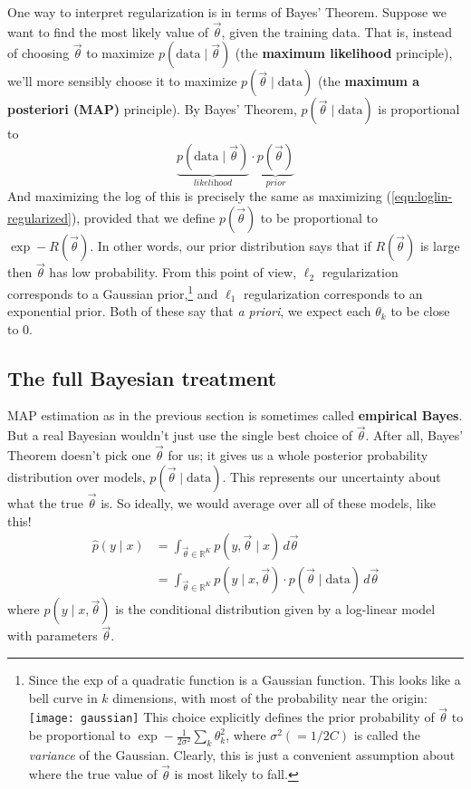 \documentclass[11pt]{article}
\newcommand{\vtheta}{\vec{\theta}}
\newcommand{\ph}{\hat{p}}
\newcommand{\Real}{{\mathbb R}}
\begin{document}
One way to interpret regularization is in terms of Bayes'
Theorem.  Suppose we want to find the most likely value of $\vtheta$,
given the training data.  That is, instead of choosing $\vtheta$ to
maximize $p(\textrm{data} \mid \vtheta)$ (the {\bf maximum likelihood}
principle), we'll more sensibly choose it to maximize $p(\vtheta \mid
\textrm{data})$ (the {\bf maximum a posteriori (MAP)} principle).  By
Bayes' Theorem, $p(\vtheta \mid \textrm{data})$ is proportional to
\begin{equation}
\underbrace{p(\textrm{data} \mid \vtheta)}_{\textit{likelihood}} \cdot \underbrace{p(\vtheta)}_{\textit{prior}}
\end{equation}
And maximizing the log of this is precisely the same as maximizing
(\ref{eqn:loglin-regularized}), provided that we define $p(\vtheta)$
to be proportional to $\exp -R(\vtheta)$.  In other words, our prior
distribution says that if $R(\vtheta)$ is large then $\vtheta$ has low
probability.  From this point of view, $\ell_2$ regularization
corresponds to a Gaussian prior,\footnote{Since the exp of a quadratic
  function is a Gaussian function.  This looks like a bell curve in
  $k$ dimensions, with most of the probability near the
  origin: \texttt{[image: gaussian]} This choice explicitly defines the prior
  probability of $\vtheta$ to be proportional to $\exp -\frac{1}{2\sigma^2} \sum_k
  \theta_k^2$, where $\sigma^2 (= 1/2C)$ is called the {\em variance} of the
  Gaussian.  Clearly, this is just a convenient assumption about
  where the true value of $\vtheta$ is most likely to fall.%
}  and $\ell_1$
regularization corresponds to an exponential prior.  Both of these say
that {\em a priori}, we expect each $\theta_k$ to be close to 0.

\subsection{The full Bayesian treatment}

MAP estimation as in the previous section is sometimes called {\bf empirical Bayes}.  But a real Bayesian wouldn't just use the single best choice of $\vtheta$.  After all, Bayes' Theorem doesn't pick one $\vtheta$ for us; it gives us a whole posterior probability distribution over models, $p(\vtheta \mid \textrm{data})$.  This represents our uncertainty about what the true $\vtheta$ is.  So ideally, we would average over all of these models, like this!
\begin{align}
\ph(y \mid x)
&= \int_{\vtheta\in \Real^K} p(y, \vtheta \mid x)\,d\vtheta \\
&= \int_{\vtheta\in \Real^K} p(y \mid x,\vtheta)\cdot p(\vtheta \mid \textrm{data}) \,d\vtheta
\end{align}
where $p(y \mid x,\vtheta)$ is the conditional distribution given by a log-linear model with parameters $\vtheta$.
\end{document}
